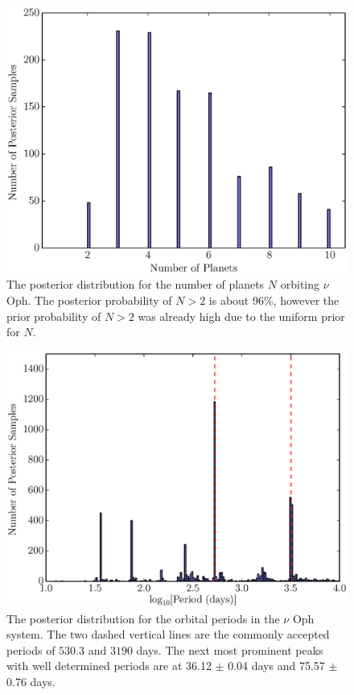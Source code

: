 \documentclass[useAMS,usenatbib]{mn2e}
\begin{document}
\begin{figure}
\includegraphics[scale=0.45]{Figures/nu_oph_N.eps}
\caption{The posterior distribution for the number of planets $N$ orbiting
$\nu$ Oph. The posterior probability of $N > 2$ is about 96\%, however the
prior probability of $N > 2$ was already high due to the uniform prior for $N$.
\label{fig:nu_oph_N}}
\end{figure}

\begin{figure}
\includegraphics[scale=0.45]{Figures/nu_oph_periods.eps}
\caption{The posterior distribution for the orbital periods in the $\nu$ Oph
system. The two dashed vertical lines are the commonly accepted periods
of $530.3$ and $3190$ days. The next most prominent peaks with well determined
periods are at 36.12 $\pm$ 0.04 days and
75.57 $\pm$ 0.76 days.\label{fig:nu_oph_periods}}
\end{figure}
\end{document}
